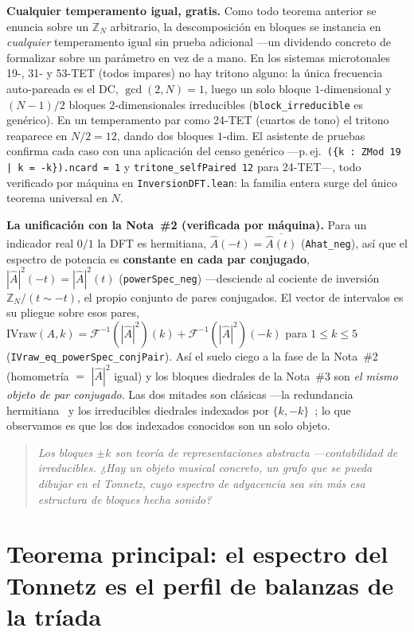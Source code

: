 \documentclass[11pt]{article}
\newcommand{\lean}[1]{\texttt{#1}}
\newcommand{\qlink}[1]{\par\medskip\begin{quote}\itshape\small\color{ctB!88!black}#1\end{quote}\medskip}
\newcommand{\Zn}[1]{\mathbb{Z}_{#1}}
\newcommand{\dft}{\mathcal{F}}
\newcommand{\Ahat}{\hat{A}}
\begin{document}
\textbf{Cualquier temperamento igual, gratis.} Como todo teorema anterior se enuncia sobre un $\Zn{N}$
arbitrario, la descomposici\'on en bloques se instancia en \emph{cualquier} temperamento igual sin prueba
adicional ---un dividendo concreto de formalizar sobre un par\'ametro en vez de a mano. En los sistemas
microtonales 19-, 31- y 53-TET (todos impares) no hay tritono alguno: la \'unica frecuencia auto-pareada
es el DC, $\gcd(2,N)=1$, luego un solo bloque $1$-dimensional y $(N-1)/2$ bloques $2$-dimensionales
irreducibles (\lean{block\_irreducible} es gen\'erico). En un temperamento par como 24-TET (cuartos de
tono) el tritono reaparece en $N/2=12$, dando dos bloques $1$-dim. El asistente de pruebas confirma cada
caso con una aplicaci\'on del censo gen\'erico ---p.\,ej.\ \lean{(\{k : ZMod 19 | k = -k\}).ncard = 1} y
\lean{tritone\_selfPaired 12} para 24-TET---, todo verificado por m\'aquina en \lean{InversionDFT.lean}: la
familia entera surge del \'unico teorema universal en $N$.

\textbf{La unificaci\'on con la Nota~\#2 (verificada por m\'aquina).} Para un indicador real $0/1$ la DFT es
hermitiana, $\Ahat(-t)=\overline{\Ahat(t)}$ (\lean{Ahat\_neg}), as\'i que el espectro de potencia es
\textbf{constante en cada par conjugado}, $|\Ahat|^2(-t)=|\Ahat|^2(t)$ (\lean{powerSpec\_neg}) ---desciende
al cociente de inversi\'on $\Zn{N}/(t\sim-t)$, el propio conjunto de pares conjugados. El vector de
intervalos es su pliegue sobre esos pares,
$\mathrm{IVraw}(A,k)=\dft^{-1}(|\Ahat|^2)(k)+\dft^{-1}(|\Ahat|^2)(-k)$ para $1\le k\le5$
(\lean{IVraw\_eq\_powerSpec\_conjPair}). As\'i el suelo ciego a la fase de la Nota~\#2 (homometr\'ia $=$
$|\Ahat|^2$ igual) y los bloques diedrales de la Nota~\#3 son \emph{el mismo objeto de par conjugado}. Las
dos mitades son cl\'asicas ---la redundancia hermitiana~\cite{Amiot,MGAAA} y los irreducibles diedrales
indexados por $\{k,-k\}$~\cite{CFS}; lo que observamos es que los dos indexados conocidos son un solo objeto.

\qlink{Los bloques $\pm k$ son teor\'ia de representaciones abstracta ---contabilidad de irreducibles. ¿Hay
un objeto musical \emph{concreto}, un grafo que se pueda dibujar en el Tonnetz, cuyo espectro de adyacencia
\emph{sea} sin m\'as esa estructura de bloques hecha sonido?}

\section{Teorema principal: el espectro del Tonnetz es el perfil de balanzas de la tr\'iada}\label{sec:tonnetz}
\end{document}
